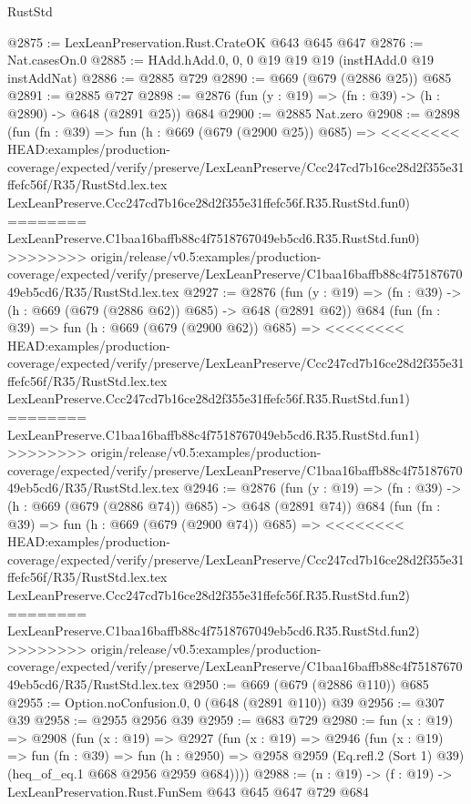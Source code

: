 \begin{lexlean}{RustStd}
\begin{coremodule}
{\begin{coremodule}
{{{{{{{@2875 := LexLeanPreservation.Rust.CrateOK @643 @645 @647
@2876 := Nat.casesOn.{0}
@2885 := HAdd.hAdd.{0, 0, 0} @19 @19 @19 (instHAdd.{0} @19 instAddNat)
@2886 := @2885 @729
@2890 := @669 (@679 (@2886 @25)) @685
@2891 := @2885 @727
@2898 := @2876 (fun (y : @19) => (fn : @39) -> (h : @2890) -> @648 (@2891 @25)) @684
@2900 := @2885 Nat.zero
@2908 := @2898
    (fun (fn : @39) =>
    fun (h : @669 (@679 (@2900 @25)) @685) =>
<<<<<<<< HEAD:examples/production-coverage/expected/verify/preserve/LexLeanPreserve/Ccc247cd7b16ce28d2f355e31ffefc56f/R35/RustStd.lex.tex
    LexLeanPreserve.Ccc247cd7b16ce28d2f355e31ffefc56f.R35.RustStd.fun0)
========
    LexLeanPreserve.C1baa16baffb88c4f7518767049eb5cd6.R35.RustStd.fun0)
>>>>>>>> origin/release/v0.5:examples/production-coverage/expected/verify/preserve/LexLeanPreserve/C1baa16baffb88c4f7518767049eb5cd6/R35/RustStd.lex.tex
@2927 := @2876
    (fun (y : @19) => (fn : @39) -> (h : @669 (@679 (@2886 @62)) @685) -> @648 (@2891 @62))
    @684
    (fun (fn : @39) =>
    fun (h : @669 (@679 (@2900 @62)) @685) =>
<<<<<<<< HEAD:examples/production-coverage/expected/verify/preserve/LexLeanPreserve/Ccc247cd7b16ce28d2f355e31ffefc56f/R35/RustStd.lex.tex
    LexLeanPreserve.Ccc247cd7b16ce28d2f355e31ffefc56f.R35.RustStd.fun1)
========
    LexLeanPreserve.C1baa16baffb88c4f7518767049eb5cd6.R35.RustStd.fun1)
>>>>>>>> origin/release/v0.5:examples/production-coverage/expected/verify/preserve/LexLeanPreserve/C1baa16baffb88c4f7518767049eb5cd6/R35/RustStd.lex.tex
@2946 := @2876
    (fun (y : @19) => (fn : @39) -> (h : @669 (@679 (@2886 @74)) @685) -> @648 (@2891 @74))
    @684
    (fun (fn : @39) =>
    fun (h : @669 (@679 (@2900 @74)) @685) =>
<<<<<<<< HEAD:examples/production-coverage/expected/verify/preserve/LexLeanPreserve/Ccc247cd7b16ce28d2f355e31ffefc56f/R35/RustStd.lex.tex
    LexLeanPreserve.Ccc247cd7b16ce28d2f355e31ffefc56f.R35.RustStd.fun2)
========
    LexLeanPreserve.C1baa16baffb88c4f7518767049eb5cd6.R35.RustStd.fun2)
>>>>>>>> origin/release/v0.5:examples/production-coverage/expected/verify/preserve/LexLeanPreserve/C1baa16baffb88c4f7518767049eb5cd6/R35/RustStd.lex.tex
@2950 := @669 (@679 (@2886 @110)) @685
@2955 := Option.noConfusion.{0, 0} (@648 (@2891 @110)) @39
@2956 := @307 @39
@2958 := @2955 @2956 @39
@2959 := @683 @729
@2980 := fun (x : @19) =>
  @2908
    (fun (x : @19) =>
    @2927
      (fun (x : @19) =>
      @2946
        (fun (x : @19) =>
        fun (fn : @39) =>
        fun (h : @2950) =>
        @2958 @2959 (Eq.refl.{2} (Sort 1) @39) (heq_of_eq.{1} @668 @2956 @2959 @684))))
@2988 := (n : @19) -> (f : @19) -> LexLeanPreservation.Rust.FunSem @643 @645 @647 @729 @684
}}}}}}}
\end{coremodule}}
\end{coremodule}
\end{lexlean}
